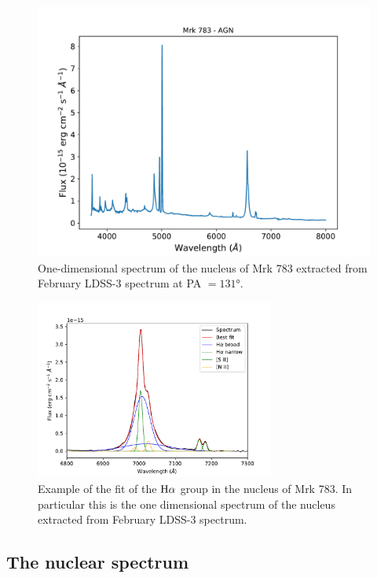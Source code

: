 \documentclass[../main.tex]{subfiles}
\begin{document}
\begin{figure}
\centering
\includegraphics[width=\textwidth]{images/paper3/spectrum_nucleus.pdf} 
\caption[]{One-dimensional spectrum of the nucleus of Mrk 783 extracted from February LDSS-3 spectrum at PA $=\ang{131}$. } 
\label{fig:all_spectra}
\end{figure} 

\begin{figure}
\centering
\includegraphics[width=0.7\textwidth]{images/paper3/deblending.pdf} 
\caption[]{Example of the fit of the $\rm H\alpha$ group in the nucleus of Mrk 783. In particular this is the one dimensional spectrum of the nucleus extracted from February LDSS-3 spectrum.} 
\label{fig:pap3_deblending}
\end{figure} 


\subsection{The nuclear spectrum}
\end{document}
